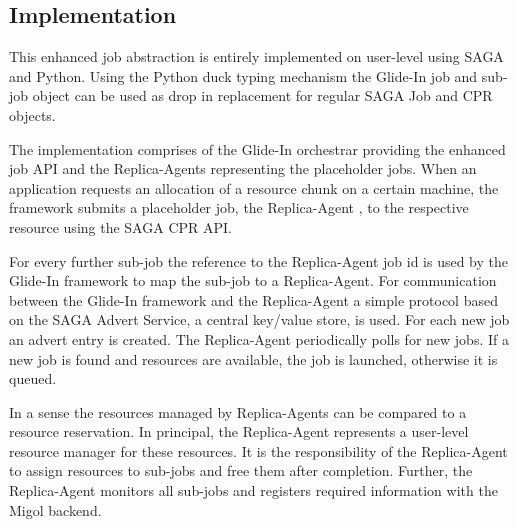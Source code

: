\documentclass{rspublic}
\newcommand{\jhanote}[1]{ {\textcolor{red} { ***SJ: #1 }}}
\newcommand{\jhanote}[1]{}
\newcommand{\glidein}[1]{Glide-In }
\newcommand{\replicaagent}[1]{Replica-Agent }
\begin{document}
\subsection{Implementation}         
 
This enhanced job abstraction is entirely implemented on user-level 
using SAGA and Python. Using the Python duck typing mechanism the 
\glidein\ job and sub-job object can 
be used as drop in replacement for regular SAGA Job and CPR objects.
                                                          
The implementation comprises of the \glidein\ orchestrar providing the 
enhanced job API and the Replica-Agents
representing the placeholder jobs. When an application requests an 
allocation of a resource chunk on a certain machine, the framework submits a
placeholder job, the \replicaagent\ , to the respective resource
using the SAGA CPR API. 

For every further sub-job the reference to the \replicaagent\ job id 
is used by the \glidein\ framework to map
the sub-job to a Replica-Agent.  For communication between the \glidein\ framework
and the \replicaagent\ a simple protocol based on the SAGA
Advert Service, a central key/value store, is used.  For each new job an advert
entry is created. The \replicaagent\ periodically polls for new jobs.
If a new job is found and resources are available, the job is launched,
otherwise it is queued.
           
In a sense the resources managed by Replica-Agents can be compared to 
a resource reservation. In principal, the Replica-Agent represents 
a user-level resource manager for these resources. It is the responsibility 
of the \replicaagent\ 
to assign resources to sub-jobs and free them after completion. Further,
the \replicaagent\ monitors all sub-jobs and registers required
information with the Migol backend.




                         


                           

               
\end{document}
